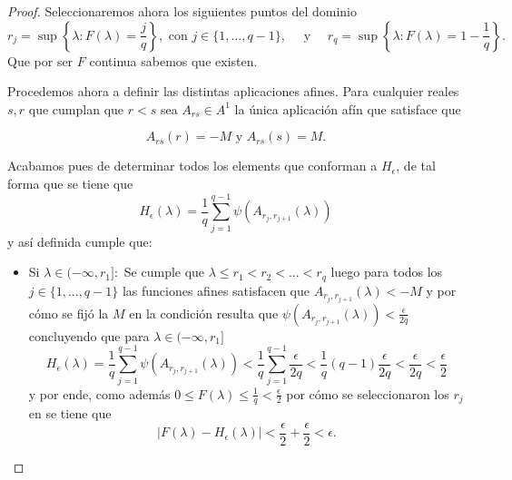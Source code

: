 \begin{proof}
    Seleccionaremos ahora los siguientes puntos del dominio
    \begin{equation}\label{lema:2_2_selección_r_F}
        r_j = \sup \left\{ \lambda: F(\lambda) = \frac{j}{q} \right\},
         \text{ con } j \in \{1, ..., q-1\}, 
         \quad \text{ y } \quad
        r_q = \sup \left\{ \lambda: F(\lambda) = 1 - \frac{1}{q} \right\}. 
    \end{equation}
    Que por ser $F$ continua sabemos que existen. 

    Procedemos ahora a definir las distintas aplicaciones afines. 
    Para cualquier reales $s,r$ que cumplan que $r < s$ sea $A_{rs}\in A^1$ la única aplicación afín que satisface que 
    
    \begin{equation}
        A_{rs}(r) = -M \text{ y }  A_{rs}(s) = M. 
    \end{equation} 
    
    Acabamos pues de determinar todos los elements que conforman a $H_\epsilon$, de tal forma que se tiene que
    \begin{equation}
        H_\epsilon(\lambda) = \frac{1}{q} \sum^{q-1}_{j=1} \psi( A_{r_j, r_{j+1}}(\lambda))
    \end{equation}
    y así definida cumple que: 
    \begin{itemize}
        \item Si $\lambda \in (- \infty, r_1]:$
        Se cumple que $\lambda \leq r_1 < r_2 <...< r_q$ luego  
        para todos los $j \in \{1, ..., q-1\}$ las funciones afines satisfacen que 
        $A_{r_j, r_{j+1}}(\lambda) < -M$ y por cómo se fijó la $M$ en la condición 
        resulta que  $\psi( A_{r_j, r_{j+1}}(\lambda)) < \frac{\epsilon}{2q}$ concluyendo que 
        para $\lambda \in (- \infty, r_1]$
        \begin{equation}
            H_\epsilon(\lambda) = \frac{1}{q} \sum^{q-1}_{j=1} \psi( A_{r_j, r_{j+1}}(\lambda)) 
            <
            \frac{1}{q} \sum^{q-1}_{j=1}  \frac{\epsilon}{2q}
            < 
            \frac{1}{q} (q-1) \frac{\epsilon }{2q}
            <\frac{\epsilon }{2q}
            < \frac{\epsilon }{2}
        \end{equation}
        y por ende, como además $0 \leq F(\lambda) \leq \frac{1}{q} < \frac{\epsilon}{2}$ por cómo se seleccionaron los $r_j$ en 
         se tiene que 
        \begin{equation}
            | F(\lambda) - H_{\epsilon}(\lambda) | < \frac{\epsilon}{2} + \frac{\epsilon}{2} < \epsilon. 
        \end{equation}


\end{itemize}
\end{proof}
